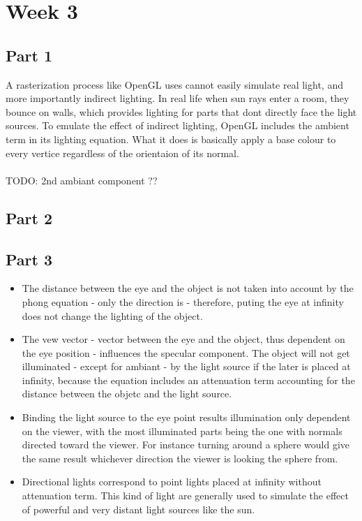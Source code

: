 \chapter{Week 3}

\section{Part 1}

A rasterization process like OpenGL uses cannot easily simulate real light, and
more importantly indirect lighting. In real life when sun rays enter a room, they
bounce on walls, which provides lighting for parts that dont directly face the light
sources. To emulate the effect of indirect lighting, OpenGL includes the ambient
term in its lighting equation. What it does is basically apply a base colour to
every vertice regardless of the orientaion of its normal. 
~\\
~\\
TODO: 2nd ambiant component ??


\section{Part 2}

\section{Part 3}
\begin{itemize}
    \item The distance between the eye and the object is not taken into account by the phong
    equation - only the direction is - therefore, puting the eye at infinity does not
    change the lighting of the object.
    \item The vew vector - vector between the eye and the object, thus dependent on the
    eye position - influences the specular component.
    The object will not get illuminated - except for ambiant - by the light source if the later is placed at
    infinity, because the equation includes an attenuation term accounting for the
    distance between the objetc and the light source.
    \item Binding the light source to the eye point results illumination only dependent on
    the viewer, with the most illuminated parts being the one with normals directed
    toward the viewer. For instance turning around a sphere would give the same
    result whichever direction the viewer is looking the sphere from.
    \item Directional lights correspond to point lights placed at infinity without attenuation
    term. This kind of light are generally used to simulate the effect of powerful
    and very distant light sources like the sun.
\end{itemize}
